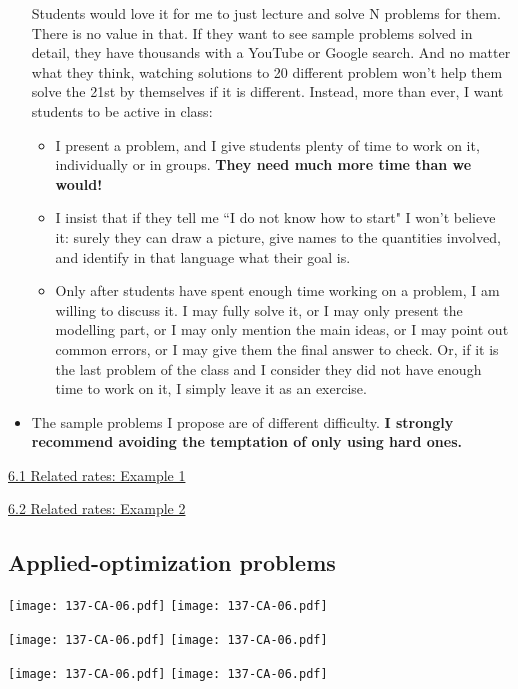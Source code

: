 \documentclass[11pt]{article}
\newcommand{\vi}{\hspace{8mm} \href{https://www.youtube.com/watch?v=TjW3e01KW8M&list=PLlwePzQY_wW9EsqbQzPdJTNGsHYvO_2CJ&index=1}{6.1 Related rates: Example 1}}
\newcommand{\vii}{\hspace{8mm} \href{https://www.youtube.com/watch?v=DyoVgunLR18&list=PLlwePzQY_wW9EsqbQzPdJTNGsHYvO_2CJ&index=2}{6.2 Related rates: Example 2
}}
\begin{document}
\begin{comments}
\begin{itemize}
		Students would love it for me to just lecture and solve N problems for them.  There is no value in that.  If they want to see sample problems solved in detail, they have thousands with a YouTube or Google search.  And no matter what they think, watching solutions to 20 different problem won't help them solve the 21st by themselves if it is different.  Instead, more than ever, I want students to be active in class:
			\begin{itemize}
				\item   I present a problem, and I give students plenty of time to work on it, individually or in groups.  \textbf{They need much more time than we would!}
				\item I insist that if they tell me ``I do not know how to start" I won't believe it: surely they can draw a picture, give names to the quantities involved, and identify in that language what their goal is.  
				\item Only after students have spent enough time working on a problem, I am willing to discuss it.  I may fully solve it, or I may only present the modelling part, or I may only mention the main ideas, or I may point out common errors, or I may give them the final answer to check.  Or, if it is the last problem of the class and I consider they did not have enough time to work on it, I simply leave it as an exercise.
			\end{itemize}
		\item The sample problems I propose are of different difficulty.  \textbf{I strongly recommend avoiding the temptation of only using hard ones.}
	\end{itemize}
\end{comments}

\begin{videos}
\vi

\vii
\end{videos}

\newpage

\subsection{Applied-optimization problems}

\begin{center}
{ \texttt{[image: 137-CA-06.pdf]}} \quad
{ \texttt{[image: 137-CA-06.pdf]}} 

\vspace{-2cm}

{ \texttt{[image: 137-CA-06.pdf]}} \quad
{ \texttt{[image: 137-CA-06.pdf]}} 

\vspace{-2cm}

{ \texttt{[image: 137-CA-06.pdf]}} \quad
{ \texttt{[image: 137-CA-06.pdf]}} \end{center}
\end{document}
